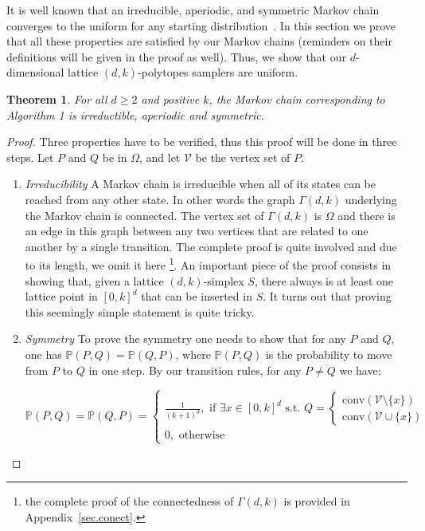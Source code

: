 \documentclass[a4paper]{article}
\newtheorem{theorem}{Theorem}
\begin{document}
It is well known that an irreducible, aperiodic, and symmetric Markov chain converges to the uniform for any starting distribution~\cite{levin2009markov}. In this section we prove that all these properties are satisfied by our Markov chains (reminders on their definitions will be given in the proof as well). Thus, we show that our $d$-dimensional lattice $(d,k)$-polytopes samplers are uniform.

\begin{theorem}\label{Thm.MC}
  For all $d\geq2$ and positive $k$, the Markov chain corresponding to Algorithm 1 is irreductible, aperiodic and symmetric.
\end{theorem}

\begin{proof}
  Three properties have to be verified, thus this proof will be done in three steps. Let $P$ and $Q$ be in $\Omega$, and let $\mathcal{V}$ be the vertex set of $P$.

  \begin{enumerate}[i]
    \item \textit{Irreducibility}
    A Markov chain is irreducible when all of its states can be reached from any other state. In other words the graph $\Gamma(d,k)$ underlying the Markov chain is connected. The vertex set of $\Gamma(d, k)$ is $\Omega$ and there is an edge in this graph between any two vertices that are related to one another by a single transition. The complete proof is quite involved and due to its length, we omit it here \footnote{the complete proof of the connectedness of $\Gamma(d,k)$ is provided in Appendix~\ref{sec.conect}.}. An important piece of the proof consists in showing that, given a lattice $(d,k)$-simplex $S$, there always is at least one lattice point in $[0,k]^d$ that can be inserted in $S$. It turns out that proving this seemingly simple statement is quite tricky.

    \item \textit{Symmetry}
    To prove the symmetry one needs to show that for any $P$ and $Q$, one has $\mathbb{P}(P,Q)=\mathbb{P}(Q,P)$, where $\mathbb{P}(P,Q)$ is the probability to move from $P$ to $Q$ in one step. By our transition rules, for any $P \neq Q$ we have:

    $$
      \mathbb{P}(P,Q)=\mathbb{P}(Q,P) =
      \begin{cases}
        \frac{1}{(k+1)^d}, \text{ if } \exists x \in [0,k]^d \text{ s.t. } Q=
          \begin{cases}
            \mathrm{conv}(\mathcal{V}\mathord{\setminus}\{x\})\\
            \mathrm{conv}(\mathcal{V}\cup\{x\})
          \end{cases}
        \\
        0, \text{ otherwise }
      \end{cases}
    $$


\end{enumerate}
\end{proof}
\end{document}
